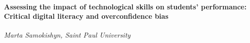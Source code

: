 \documentclass[
]{book}
\begin{document}
\begin{secondary}
\hypertarget{assessing-the-impact-of-technological-skills-on-students-performance-critical-digital-literacy-and-overconfidence-bias}{%
\paragraph{Assessing the impact of technological skills on students'
performance: Critical digital literacy and overconfidence
bias}\label{assessing-the-impact-of-technological-skills-on-students-performance-critical-digital-literacy-and-overconfidence-bias}}

\emph{Marta Samokishyn, Saint Paul University}
\end{secondary}
\end{document}
